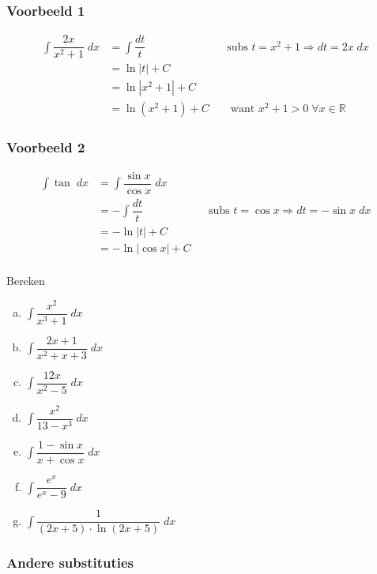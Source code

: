\documentclass[a4paper,12pt, twoside]{article}
\begin{document}
\vspace{-1cm}
\subsubsection*{Voorbeeld 1}
\begin{align*}
  \int \dfrac{2x}{x^2+1} \;dx
  &= \int \dfrac{dt}{t} && \mbox{subs }t=x^2+1 \Rightarrow dt = 2x\;dx\\
  &= \ln |t| +C\\
  &= \ln |x^2+1| + C\\
  &= \ln(x^2+1) + C  &&\mbox{ want } x^2+1 > 0 \;  \forall x \in \mathbb{R}
\end{align*}

\vspace{-1cm}
\subsubsection*{Voorbeeld 2}
\begin{align*}
  \int \tan \;dx &= \int \dfrac{\sin x}{\cos x} \;dx\\
  &= - \int \dfrac{dt}{t} &&\mbox{subs }t=\cos x \Rightarrow dt = -\sin x\;dx\\
  &= - \ln |t| +C\\
  &= - \ln |\cos x| + C\\
\end{align*}

\vspace{-1cm}
\begin{oefening}
  Bereken
  \begin{multicols}{2}
  \begin{enumerate}[(a)]
  \item $\displaystyle\int \dfrac{x^2}{x^3+1} \;dx$
  \item $\displaystyle\int \dfrac{2x+1}{x^2+x+3} \;dx$
  \item $\displaystyle\int \dfrac{12x}{x^2-5} \;dx$
  \item $\displaystyle\int \dfrac{x^2}{13-x^3} \;dx$
  \item $\displaystyle\int \dfrac{1-\sin x}{x+\cos x} \;dx$
  \item $\displaystyle\int \dfrac{e^x}{e^x-9} \;dx$
  \item $\displaystyle\int \dfrac{1}{(2x+5) \cdot \ln(2x+5)} \;dx$
  \end{enumerate}
\end{multicols}
\end{oefening}

\subsubsection{Andere substituties}
\end{document}

